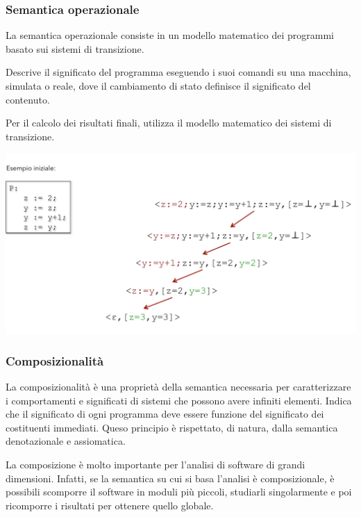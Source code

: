 \documentclass[a4paper, 10pt]{report}
\begin{document}
\subsubsection*{Semantica operazionale}
La semantica operazionale consiste in un modello matematico  dei programmi basato sui sistemi di transizione.

Descrive   il   significato   del programma  eseguendo  i  suoi  comandi  su  una  macchina, simulata   o   reale, dove il cambiamento di stato definisce il significato del contenuto.

Per il calcolo dei risultati finali, utilizza il modello matematico dei sistemi di transizione.

\begin{center}
\includegraphics[scale=0.75]{immagine03.pdf}
\end{center}

\subsubsection*{Composizionalità}
La composizionalità è una proprietà della semantica necessaria  per  caratterizzare  i  comportamenti  e  significati di sistemi che possono avere infiniti elementi. Indica che il significato di ogni programma deve essere funzione del significato dei costituenti immediati. Queso principio è rispettato, di natura, dalla semantica denotazionale e assiomatica.

La composizione è molto importante per l'analisi di software di grandi dimensioni. Infatti, se la semantica su cui si basa l'analisi è composizionale, è possibili scomporre il software in moduli più piccoli, studiarli singolarmente e poi ricomporre i risultati per ottenere quello globale.
\end{document}
